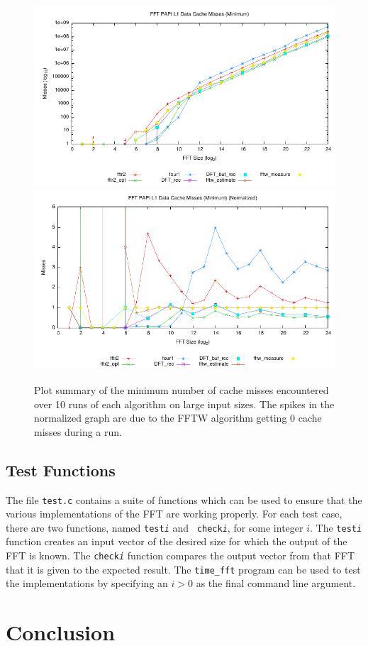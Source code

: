 \documentclass[11 pt]{article}
\begin{document}
\begin{figure}[htbp]
  \centering
	\includegraphics[width=\columnwidth]{../plots/l1dcm_min}
	\includegraphics[width=\columnwidth]{../plots/l1dcm_min_norm}
  \caption{Plot summary of the minimum number of cache misses encountered over
		10 runs of each algorithm on large input sizes. The spikes in the
		normalized graph are due to the FFTW algorithm getting 0 cache misses
		during a run.}
  \label{fig:cache_misses_min}
\end{figure}

\subsection{Test Functions}
The file {\tt test.c} contains a suite of functions which can be used to ensure
that the various implementations of the FFT are working properly.  For each
test case, there are two functions, named {\tt test\emph{i}} and {\tt
	check\emph{i}}, for some integer $i$.  The {\tt test\emph{i}} function
creates an input vector of the desired size for which the output of the FFT is
known.  The {\tt check\emph{i}} function compares the output vector from that
FFT that it is given to the expected result.  The {\tt time\_fft} program can
be used to test the implementations by specifying an $i > 0$ as the final
command line argument.

\section{Conclusion}




\end{document}
